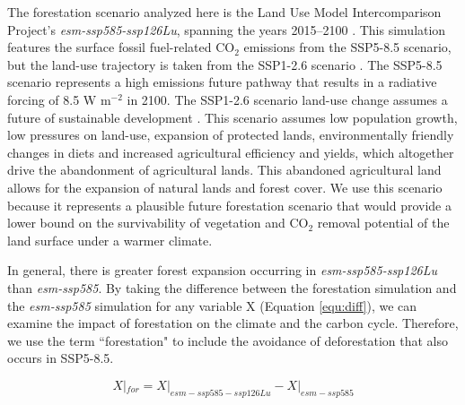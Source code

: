 \documentclass[draft]{agujournal2019}
\begin{document}
The forestation scenario analyzed here is the Land Use Model Intercomparison Project's \textit{esm-ssp585-ssp126Lu}, spanning the years 2015--2100 \cite{lawrence_land_2016} .
This simulation features the surface fossil fuel-related CO$_{2}$ emissions from the SSP5-8.5 scenario, but the land-use trajectory is taken from the SSP1-2.6 scenario \cite{oneill_scenario_2016}.
The SSP5-8.5 scenario represents a high emissions future pathway that results in a radiative forcing of 8.5 W m$^{-2}$ in 2100.
The SSP1-2.6 scenario land-use change assumes a future of sustainable development \cite{van_vuuren_energy_2017}.
This scenario assumes low population growth, low pressures on land-use, expansion of protected lands, environmentally friendly changes in diets and increased agricultural efficiency and yields, which altogether drive the abandonment of agricultural lands.
This abandoned agricultural land allows for the expansion of natural lands and forest cover.
We use this scenario because it represents a plausible future forestation scenario that would provide a lower bound on the survivability of vegetation and CO$_2$ removal potential of the land surface under a warmer climate.

In general, there is greater forest expansion occurring in \textit{esm-ssp585-ssp126Lu} than \textit{esm-ssp585}.
By taking the difference between the forestation simulation and the \textit{esm-ssp585} simulation for any variable X (Equation \ref{equ:diff}), we can examine the impact of forestation on the climate and the carbon cycle.
Therefore, we use the term ``forestation" to include the avoidance of deforestation that also occurs in SSP5-8.5.

\begin{linenomath*}
\begin{equation}
    X|_{for} = X|_{esm-ssp585-ssp126Lu} - X|_{esm-ssp585}
    \label{equ:diff}
\end{equation}
\end{linenomath*}
\end{document}
